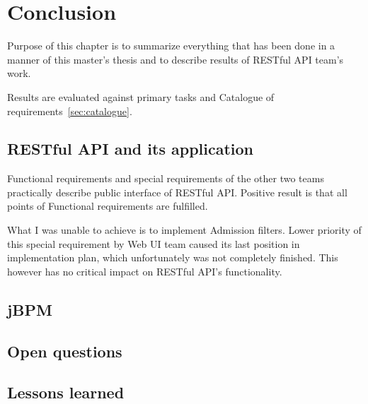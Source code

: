\chapter{Conclusion}\label{cha:conclusion}

	Purpose of this chapter is to summarize everything that has been done in a manner of this master's thesis and to
	describe results of RESTful API team's work.
	
	Results are evaluated against primary tasks and Catalogue of requirements~\ref{sec:catalogue}.
	
	\section{RESTful API and its application}
	
	Functional requirements and special requirements of the other two teams practically describe public interface of
	RESTful API.
	Positive result is that all points of Functional requirements are fulfilled.
	
	What I was unable to achieve is to implement Admission filters. Lower priority of this special requirement by Web UI
	team caused its last position in implementation plan, which unfortunately was not completely finished. This however has
	no critical impact on RESTful API's functionality.
	
	\section{jBPM}
	
	\section{Open questions}

	\section{Lessons learned}

